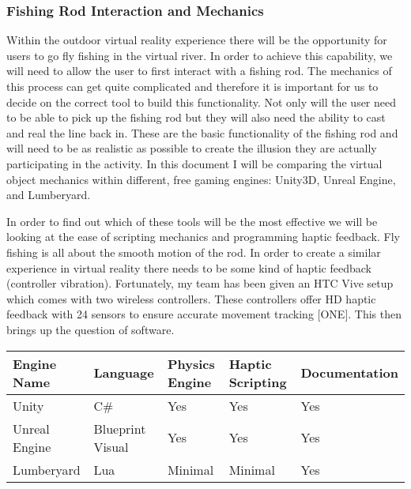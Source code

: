\documentclass[10pt,journal,compsoc,onecolumn, draftclsnofoot]{IEEEtran}
\begin{document}
\subsubsection{Fishing Rod Interaction and Mechanics}
Within the outdoor virtual reality experience there will be the opportunity for users to go fly fishing in the virtual river. In order to achieve this capability, we will need to allow the user to first interact with a fishing rod. The mechanics of this process can get quite complicated and therefore it is important for us to decide on the correct tool to build this functionality. Not only will the user need to be able to pick up the fishing rod but they will also need the ability to cast and real the line back in. These are the basic functionality of the fishing rod and will need to be as realistic as possible to create the illusion they are actually participating in the activity. In this document I will be comparing the virtual object mechanics within different, free gaming engines: Unity3D, Unreal Engine, and Lumberyard.

In order to find out which of these tools will be the most effective we will be looking at the ease of scripting mechanics and programming haptic feedback. Fly fishing is all about the smooth motion of the rod. In order to create a similar experience in virtual reality there needs to be some kind of haptic feedback (controller vibration). Fortunately, my team has been given an HTC Vive setup which comes with two wireless controllers. These controllers offer HD haptic feedback with 24 sensors to ensure accurate movement tracking [ONE]. This then brings up the question of software.

\vspace{2mm}
\begin{table}[h!]
\centering
  \begin{tabu} to 1.0\textwidth { | X[l] || X[c] | X[c] | X[c] | X[c] |  }
  \hline
  Engine Name & Language & Physics Engine & Haptic Scripting & Documentation\\
  \hline
  Unity  & C\# & Yes & Yes & Yes\\
  Unreal Engine &   Blueprint Visual  & Yes & Yes & Yes\\
  Lumberyard & Lua & Minimal & Minimal & Yes \\
  \hline
  \end{tabu}
\end{table}
\vspace{2mm}
\end{document}
